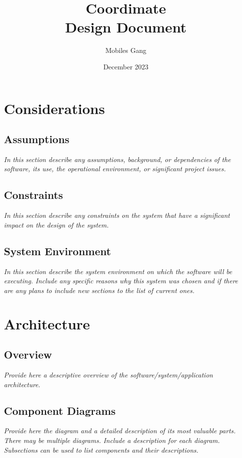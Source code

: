 \documentclass{article}
\title{Coordimate\\Design Document}
\date{December 2023}
\author{Mobiles Gang}
\begin{document}
\maketitle

\section{Considerations}

\subsection{Assumptions}

\textit{In this section describe any assumptions, background, or dependencies of the
software, its use, the operational environment, or significant project issues.}

\subsection{Constraints}

\textit{In this section describe any constraints on the system that have a significant
impact on the design of the system.}

\subsection{System Environment}

\textit{In this section describe the system environment on which the software will be
executing. Include any specific reasons why this system was chosen and if there
are any plans to include new sections to the list of current ones.}


\section{Architecture}

\subsection{Overview}

\textit{Provide here a descriptive overview of the software/system/application
architecture.}

\subsection{Component Diagrams}

\textit{Provide here the diagram and a detailed description of its most valuable
parts. There may be multiple diagrams. Include a description for each diagram.
Subsections can be used to list components and their descriptions.}
\end{document}
